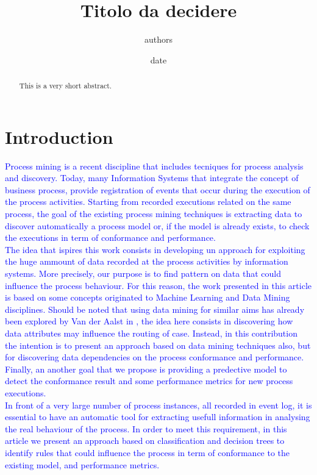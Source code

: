 \documentclass[11pt]{article}
\title{Titolo da decidere}
\author{authors}
\date{date}
\begin{document}
\maketitle
\begin{abstract}
This is a very short abstract.
\end{abstract}

\section{Introduction}

\textcolor{blue}{
Process mining is a recent discipline that includes tecniques for process analysis and discovery. Today, many Information Systems that integrate the concept of business process, provide registration of events that occur during the execution of the process activities. Starting from recorded executions related on the same process, the goal of the existing process mining techniques is extracting data to discover automatically a process model or, if the model is already exists, to check the executions in term of conformance and performance.\\
\newline
The idea that ispires this work consists in developing un approach for exploiting the huge ammount of data recorded at the process activities by information systems. More precisely, our purpose is to find pattern on data that could influence the process behaviour. For this reason, the work presented in this article is based on some concepts originated to Machine Learning and Data Mining disciplines. Should be noted that using data mining for similar aims has already been explored by Van der Aalst in \cite{}, the idea here consists in discovering how data attributes may influence the routing of case. Instead, in this contribution the intention is to present an approach based on data mining techniques also, but for discovering data dependencies on the process conformance and performance. Finally, an another goal that we propose is providing a predective model to detect the conformance result and some performance metrics for new process executions.  \\}
\newline
\textcolor{blue}{In front of a very large number of process instances, all recorded in event log, it is essential to have an automatic tool for extracting usefull information in analysing the real behaviour of the process. In order to meet this requirement, in this article we present an approach based on classification and decision trees to identify rules that could influence the process in term of conformance to the existing model, and performance metrics.\\}
\end{document}
